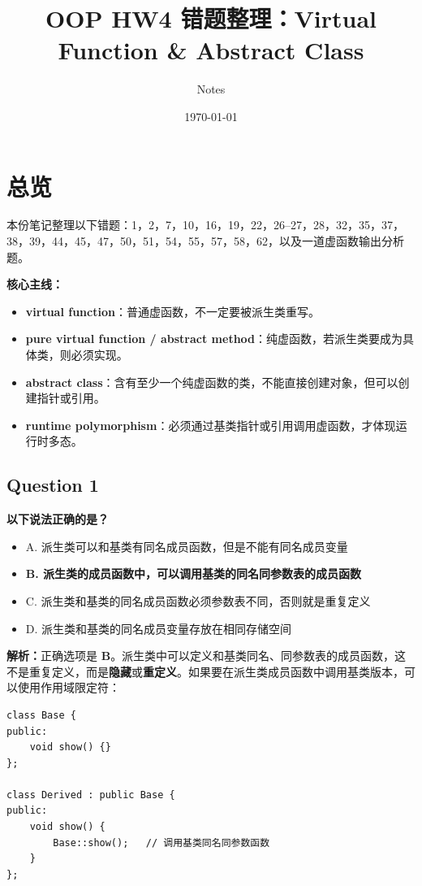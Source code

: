 \documentclass[11pt, a4paper]{article}
\title{OOP HW4 错题整理：Virtual Function \& Abstract Class}
\author{Notes}
\date{\today}
\begin{document}
\maketitle

\section*{总览}
本份笔记整理以下错题：1，2，7，10，16，19，22，26--27，28，32，35，37，38，39，44，45，47，50，51，54，55，57，58，62，以及一道虚函数输出分析题。

\bigskip

\noindent \textbf{核心主线：}
\begin{itemize}
    \item \textbf{virtual function}：普通虚函数，不一定要被派生类重写。
    \item \textbf{pure virtual function / abstract method}：纯虚函数，若派生类要成为具体类，则必须实现。
    \item \textbf{abstract class}：含有至少一个纯虚函数的类，不能直接创建对象，但可以创建指针或引用。
    \item \textbf{runtime polymorphism}：必须通过基类指针或引用调用虚函数，才体现运行时多态。
\end{itemize}


\subsection*{Question 1}
\textbf{以下说法正确的是？}
\begin{itemize}
    \item A. 派生类可以和基类有同名成员函数，但是不能有同名成员变量
    \item \textbf{B. 派生类的成员函数中，可以调用基类的同名同参数表的成员函数}
    \item C. 派生类和基类的同名成员函数必须参数表不同，否则就是重复定义
    \item D. 派生类和基类的同名成员变量存放在相同存储空间
\end{itemize}

\textbf{解析：}正确选项是 \textbf{B}。派生类中可以定义和基类同名、同参数表的成员函数，这不是重复定义，而是\textbf{隐藏}或\textbf{重定义}。如果要在派生类成员函数中调用基类版本，可以使用作用域限定符：
\begin{lstlisting}
class Base {
public:
    void show() {}
};

class Derived : public Base {
public:
    void show() {
        Base::show();   // 调用基类同名同参数函数
    }
};
\end{lstlisting}
\end{document}
